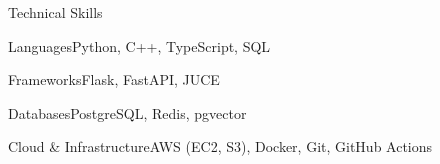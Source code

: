 \documentclass[
	11pt
]{../../../template}
\begin{document}
	\begin{rSection}{T}{echnical Skills}
		\begin{rSet}{Languages}{Python, C++, TypeScript, SQL}
		\end{rSet}
		\begin{rSet}{Frameworks}{Flask, FastAPI, JUCE}
		\end{rSet}
		\begin{rSet}{Databases}{PostgreSQL, Redis, pgvector}
		\end{rSet}
		\begin{rSet}{Cloud \& Infrastructure}{AWS (EC2, S3), Docker, Git, GitHub Actions}
		\end{rSet}
	\end{rSection}
\end{document}
